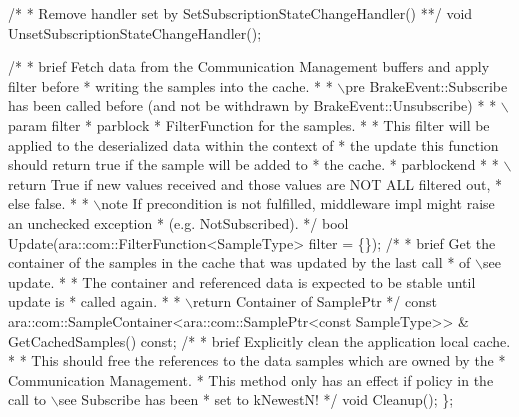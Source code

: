 \begin{DoxyCode}
   \textcolor{comment}{/*}
\textcolor{comment}{   * Remove handler set by SetSubscriptionStateChangeHandler()}
\textcolor{comment}{   **/}
   \textcolor{keywordtype}{void} UnsetSubscriptionStateChangeHandler();

   \textcolor{comment}{/*}
\textcolor{comment}{   * brief Fetch data from the Communication Management buffers and apply}
\textcolor{comment}{     filter before}
\textcolor{comment}{   * writing the samples into the cache.}
\textcolor{comment}{   *}
\textcolor{comment}{   * \(\backslash\)pre BrakeEvent::Subscribe has been called before (and not be}
\textcolor{comment}{     withdrawn by BrakeEvent::Unsubscribe)}
\textcolor{comment}{   *}
\textcolor{comment}{   * \(\backslash\)param filter}
\textcolor{comment}{   * parblock}
\textcolor{comment}{   * FilterFunction for the samples.}
\textcolor{comment}{   *}
\textcolor{comment}{   * This filter will be applied to the deserialized data within the}
\textcolor{comment}{     context of}
\textcolor{comment}{   * the update this function should return true if the sample will be}
\textcolor{comment}{     added to}
\textcolor{comment}{   * the cache.}
\textcolor{comment}{   * parblockend}
\textcolor{comment}{   *}
\textcolor{comment}{   * \(\backslash\)return True if new values received and those values are NOT ALL}
\textcolor{comment}{     filtered out,}
\textcolor{comment}{   * else false.}
\textcolor{comment}{   *}
\textcolor{comment}{   * \(\backslash\)note If precondition is not fulfilled, middleware impl might raise an}
\textcolor{comment}{     unchecked exception}
\textcolor{comment}{   * (e.g. NotSubscribed).}
\textcolor{comment}{   */}
   \textcolor{keywordtype}{bool} Update(ara::com::FilterFunction<SampleType> filter = \{\});
   \textcolor{comment}{/*}
\textcolor{comment}{   * brief Get the container of the samples in the cache that was updated}
\textcolor{comment}{     by the last call}
\textcolor{comment}{   * of \(\backslash\)see update.}
\textcolor{comment}{   *}
\textcolor{comment}{   * The container and referenced data is expected to be stable until}
\textcolor{comment}{     update is}
\textcolor{comment}{   * called again.}
\textcolor{comment}{   *}
\textcolor{comment}{   * \(\backslash\)return Container of SamplePtr}
\textcolor{comment}{   */}
   \textcolor{keyword}{const} ara::com::SampleContainer<ara::com::SamplePtr<const SampleType>> &
   GetCachedSamples() \textcolor{keyword}{const};
   \textcolor{comment}{/*}
\textcolor{comment}{   * brief Explicitly clean the application local cache.}
\textcolor{comment}{   *}
\textcolor{comment}{   * This should free the references to the data samples which are owned by}
\textcolor{comment}{     the}
\textcolor{comment}{   * Communication Management.}
\textcolor{comment}{   * This method only has an effect if policy in the call to \(\backslash\)see Subscribe}
\textcolor{comment}{     has been}
\textcolor{comment}{    * set to kNewestN!}
\textcolor{comment}{    */}
    \textcolor{keywordtype}{void} Cleanup();
 \};
\end{DoxyCode}
